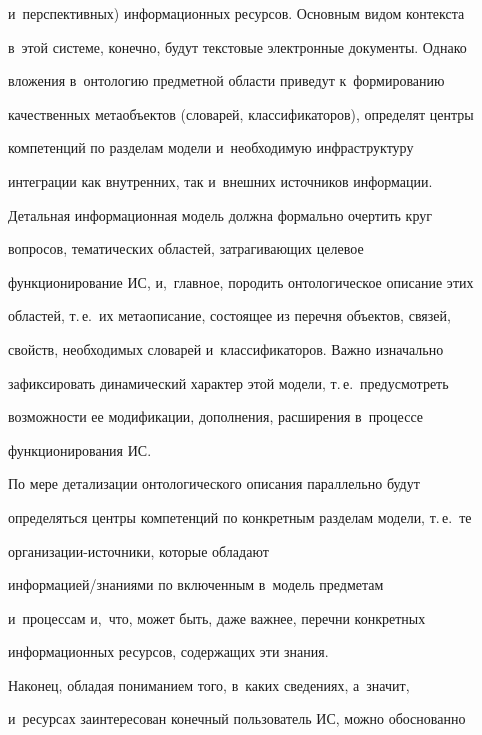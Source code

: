 и~перспективных) информационных ресурсов. Основным видом контекста 

в~этой системе, конечно, будут текстовые электронные документы. Однако 

вложения в~онтологию предметной области приведут к~формированию 

качественных метаобъектов (словарей, классификаторов), определят центры 

компетенций по разделам модели и~необходимую инфраструктуру 

интеграции как внутренних, так и~внешних источников информации.

{



}

     

     Детальная информационная модель должна формально очертить круг 

вопросов, тематических областей, затрагивающих целевое 

функционирование ИС, и,~главное, породить онтологическое описание этих 

областей, т.\,е.\ их метаописание, состоящее из перечня объектов, связей, 

свойств, необходимых словарей и~классификаторов. Важно изначально 

зафиксировать динамический характер этой модели, т.\,е.\ предусмотреть 

возможности ее модификации, дополнения, расширения в~процессе 

функционирования ИС.

     

     По мере детализации онтологического описания параллельно будут 

определяться центры компетенций по конкретным разделам модели, т.\,е.\ те 

ор\-га\-ни\-за\-ции-ис\-точ\-ни\-ки, которые обладают  

ин\-фор\-ма\-ци\-ей\!/\!зна\-ни\-ями по включенным в~модель предметам 

и~процессам и,~что, может быть, даже важнее, перечни конкретных 

информационных ресурсов, содержащих эти знания.

     

     Наконец, обладая пониманием того, в~каких сведениях, а~значит, 

и~ресурсах заинтересован конечный пользователь ИС, можно обоснованно 

